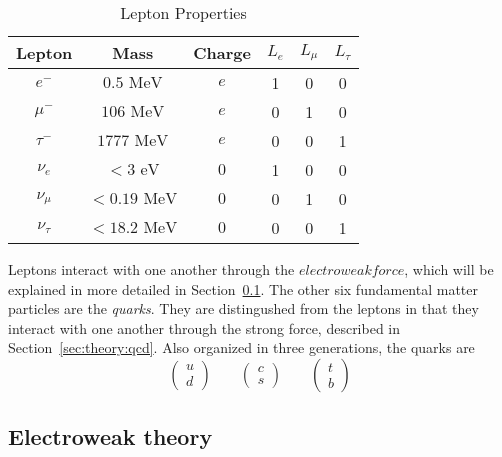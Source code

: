 \begin{table}[h!]
\begin{center}
\begin{tabular}{|c|c|c| c c c|}
\hline
Lepton        & Mass           & Charge & $L_{e}$ & $L_{\mu}$ & $L_{\tau}$ \\
\hline
$e^{-}$      & $0.5 \mbox{ MeV}$   & $e$ & 1       & 0         & 0 \\
$\mu^{-}$    & $106 \mbox{ MeV}$   & $e$ & 0       & 1         & 0 \\
$\tau^{-}$   & $1777 \mbox{ MeV}$  & $e$ & 0       & 0         & 1 \\
\hline
$\nu_{e}$    & $< 3 \mbox{ eV}$       & $0$    & 1       & 0         & 0 \\
$\nu_{\mu}$  & $< 0.19 \mbox{ MeV}$   & $0$    & 0       & 1         & 0 \\
$\nu_{\tau}$ & $< 18.2 \mbox{ MeV}$   & $0$    & 0       & 0         & 1 \\
\hline
\end{tabular}
\end{center}
\caption{Lepton Properties}
\label{table:theory:lepprop}

\end{table}
Leptons interact with one another through the $electroweak force$, which will be explained in more detailed in Section~\ref{sec:theory:ew}.\newline
The other six fundamental matter particles are the \emph{quarks}. They are distingushed from the leptons in that they interact with one another through the strong force, described in Section~\ref{sec:theory:qcd}. Also organized in three generations, the quarks are
\begin{equation}
\label{eqn:quark_flavor_doublets}
\begin{pmatrix} u \\ d \end{pmatrix} \qquad
\begin{pmatrix} c \\ s \end{pmatrix} \qquad
\begin{pmatrix} t \\ b \end{pmatrix}
\end{equation}


\subsection{Electroweak theory}
\label{sec:theory:ew}
